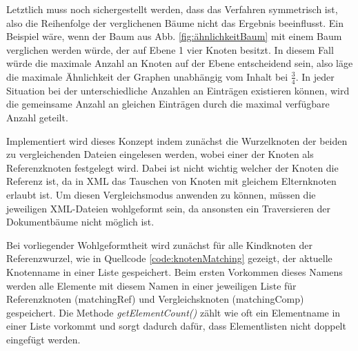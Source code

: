 Letztlich muss noch sichergestellt werden, dass das Verfahren symmetrisch ist, also die Reihenfolge der verglichenen Bäume nicht das Ergebnis beeinflusst. Ein Beispiel wäre, wenn der Baum aus Abb. \ref{fig:ähnlichkeitBaum} mit einem Baum verglichen werden würde, der auf Ebene 1 vier Knoten besitzt. In diesem Fall würde die maximale Anzahl an Knoten auf der Ebene entscheidend sein, also läge die maximale Ähnlichkeit der Graphen unabhängig vom Inhalt bei \( \frac{3}{4} \). In jeder Situation bei der unterschiedliche Anzahlen an Einträgen existieren können, wird die gemeinsame Anzahl an gleichen Einträgen durch die maximal verfügbare Anzahl geteilt.  

Implementiert wird dieses Konzept indem zunächst die Wurzelknoten der beiden zu vergleichenden Dateien eingelesen werden, wobei einer der Knoten als Referenzknoten festgelegt wird. Dabei ist nicht wichtig welcher der Knoten die Referenz ist, da in XML das Tauschen von Knoten mit gleichem Elternknoten erlaubt ist. Um diesen Vergleichsmodus anwenden zu können, müssen die jeweiligen XML-Dateien wohlgeformt sein, da ansonsten ein Traversieren der Dokumentbäume nicht möglich ist.

Bei vorliegender Wohlgeformtheit wird zunächst für alle Kindknoten der Referenzwurzel, wie in Quellcode \ref{code:knotenMatching} gezeigt, der aktuelle Knotenname in einer Liste gespeichert. Beim ersten Vorkommen dieses Namens werden alle Elemente mit diesem Namen in einer jeweiligen Liste für Referenzknoten (matchingRef) und Vergleichsknoten (matchingComp) gespeichert. Die Methode \emph{getElementCount()} zählt wie oft ein Elementname in einer Liste vorkommt und sorgt dadurch dafür, dass Elementlisten nicht doppelt eingefügt werden.

\newpage

